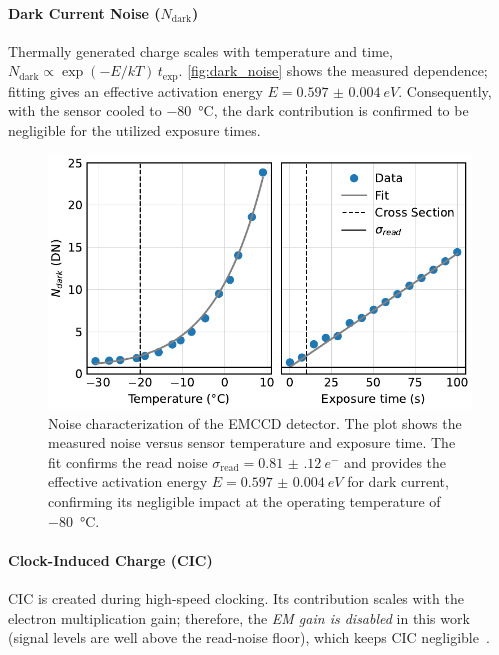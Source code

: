 \documentclass[
	a4paper,
]{scrarticle}
\begin{document}
\paragraph{Dark Current Noise ($N_{\text{dark}}$)}
Thermally generated charge scales with temperature and time,
\(N_\text{dark}\propto \exp(-E/kT)\,t_\text{exp}\).
\autoref{fig:dark_noise} shows the measured dependence; fitting gives an effective activation energy \(E=\SI{0.597(4)}{eV}\).
Consequently, with the sensor cooled to \SI{-80}{\degreeCelsius}, the dark contribution is confirmed to be negligible for the utilized exposure times.

\begin{figure}[h]
    \centering
    \includegraphics{../analysis/figures/dark_noise.pdf}
    \caption{Noise characterization of the EMCCD detector. The plot shows the measured noise versus sensor temperature and exposure time. The fit confirms the read noise $\sigma_{\text{read}}=\SI{0.81(12)}{e^{-}}$ and provides the effective activation energy $E=\SI{0.597(4)}{eV}$ for dark current, confirming its negligible impact at the operating temperature of \SI{-80}{\degreeCelsius}.}
    \label{fig:dark_noise}
\end{figure}

\paragraph{Clock-Induced Charge (CIC)}
CIC is created during high-speed clocking.
Its contribution scales with the electron multiplication gain; therefore, the \emph{EM gain is disabled} in this work (signal levels are well above the read-noise floor), which keeps CIC negligible~\cite{andorEstablishingSensitivityScientifica}.
\end{document}
